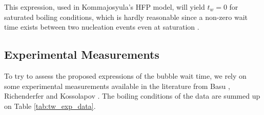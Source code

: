 \begin{remark*}
This expression, used in Kommajosyula's HFP model, will yield $t_{w}=0$ for saturated boiling conditions, which is hardly reasonable since a non-zero wait time exists between two nucleation events even at saturation \cite{gerardi_study_2010}.
\end{remark*}



\subsection{Experimental Measurements}

To try to assess the proposed expressions of the bubble wait time, we rely on some experimental measurements available in the literature from Basu \etal \cite{basu_wall_2005}, Richenderfer \cite{richenderfer_experimental_2018} and Kossolapov \cite{kossolapov_experimental_2021}. The boiling conditions of the data are summed up on Table \ref{tab:tw_exp_data}.

\begin{table}[h!]


\noindent{}

\caption{Bubble wait time data in vertical flow boiling. Wall superheat values for Richenderfer data are estimated using Frost \& Dzakowic correlation (Eq. \ref{eq:frost}).}
\label{tab:tw_exp_data}


\end{table}

